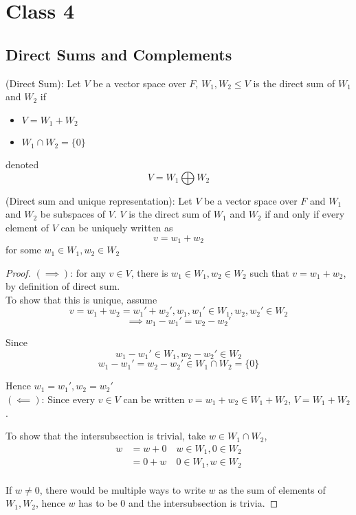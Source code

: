 \section{Class 4}

\subsection{Direct Sums and Complements}

\begin{definition}
(Direct Sum): Let $V$ be a vector space over $F$, $W_1, W_2 \leq V$ is the direct sum of $W_1$ and $W_2$ if 
    \begin{itemize}
        \item $V = W_1 + W_2$
        \item $W_1 \cap W_2 = \{ 0 \} $
    \end{itemize}
    denoted 
    \[
      V = W_1 \bigoplus W_2
    \]
\end{definition} 

\begin{proposition}
(Direct sum and unique representation): Let $V$ be a vector space over $F$ and $W_1$ and $W_2$ be subspaces of $V$. $V$ is the direct sum of $W_1$ and $W_2$ if and only if every element of $V$ can be uniquely written as 
    \[
      v = w_1 + w_2
    \]
    for some $w_1 \in W_1, w_2 \in W_2$
\end{proposition} 

\begin{proof}
$(\implies)$: for any $v \in V$, there is $w_1 \in W_1, w_2 \in W_2$  such that $v = w_1 + w_2$, by definition of direct sum. \\

To show that this is unique, assume 
\[
  v = w_1 + w_2 = w_1' + w_2', w_1, w_1' \in W_1, w_2, w_2' \in W_2
\]
\[
  \implies w_1 - w_1' = w_2 - w_2'
\]

Since 
\[
  w_1 - w_1' \in W_1, w_2 - w_2' \in W_2
\]
\[
  w_1 - w_1' = w_2 - w_2' \in W_1 \cap W_2 = \{ 0 \} 
\]

Hence $w_1 = w_1', w_2 = w_2'$ \\


$(\impliedby)$: Since every $v \in V$ can be written $v = w_1 + w_2 \in W_1 + W_2$, $V = W_1 + W_2$. 

To show that the intersubsection is trivial, take $w \in W_1 \cap W_2$, 
\begin{align*}
    w &= w + 0 \quad w \in W_1, 0 \in W_2 \\
    &= 0 + w \quad 0 \in W_1, w \in W_2 \\
\end{align*}

If $w \neq 0$, there would be multiple ways to write $w$ as the sum of elements of $W_1, W_2$, hence $w$ has to be $0$ and the intersubsection is trivia. 
\end{proof}

